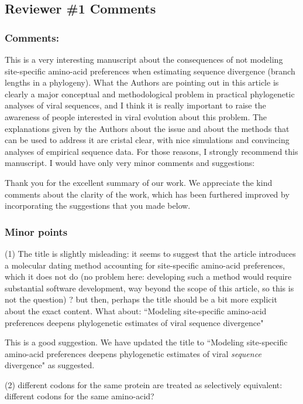 \documentclass[11pt, oneside]{article}   	%
\newcommand{\response}[1]{{\color{black}#1}}
\begin{document}
\subsection*{Reviewer \#1 Comments}

\subsubsection*{Comments:} 
This is a very interesting manuscript about the consequences of not modeling site-specific amino-acid preferences when estimating sequence divergence (branch lengths in a phylogeny). 
What the Authors are pointing out in this article is clearly a major conceptual and methodological problem in practical phylogenetic analyses of viral sequences, and I think it is really important to raise the awareness of people interested in viral evolution about this problem. 
The explanations given by the Authors about the issue and about the methods that can be used to address it are cristal clear, with nice simulations and convincing analyses of empirical sequence data. 
For those reasons, I strongly recommend this manuscript. 
I would have only very minor comments and suggestions: 

\response{Thank you for the excellent summary of our work. 
We appreciate the kind comments about the clarity of the work, which has been furthered improved by incorporating the suggestions that you made below.}

\subsubsection*{Minor points} 

(1) The title is slightly misleading: it seems to suggest that the article introduces a molecular dating method accounting for site-specific amino-acid preferences, which it does not do (no problem here: developing such a method would require substantial software development, way beyond the scope of this article, so this is not the question) ? but then, perhaps the title should be a bit more explicit about the exact content. 
What about:  ``Modeling site-specific amino-acid preferences deepens phylogenetic estimates of viral sequence divergence" 

\response{This is a good suggestion. 
We have updated the title to ``Modeling site-specific amino-acid preferences deepens phylogenetic estimates of viral \emph{sequence} divergence" as suggested.}

(2) different codons for the same protein are treated as selectively equivalent: different codons for the same amino-acid? 
\end{document}
